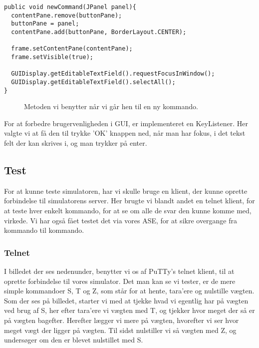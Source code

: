 \documentclass[a4paper]{article}
\begin{document}
\begin{lstlisting}
public void newCommand(JPanel panel){
  contentPane.remove(buttonPane);
  buttonPane = panel;
  contentPane.add(buttonPane, BorderLayout.CENTER);
  
  frame.setContentPane(contentPane);
  frame.setVisible(true);
  
  GUIDisplay.getEditableTextField().requestFocusInWindow();
  GUIDisplay.getEditableTextField().selectAll();
}
\end{lstlisting}
\begin{figure}[h!]
  \caption{Metoden vi benytter når vi går hen til en ny kommando.}
\end{figure}

For at forbedre brugervenligheden i GUI, er implementeret en KeyListener. Her valgte vi at få den til trykke 'OK' knappen ned, når man har fokus, i det tekst felt der kan skrives i, og man trykker på enter.




\subsection{Test} %

For at kunne teste simulatoren, har vi skulle bruge en klient, der kunne oprette forbindelse til simulatorens server. Her brugte vi blandt andet en telnet klient, for at teste hver enkelt kommando, for at se om alle de svar den kunne komme med, virkede. Vi har også fået testet det via vores ASE, for at sikre overgange fra kommando til kommando.

\subsubsection{Telnet} %

I billedet der ses nedenunder, benytter vi os af PuTTy’s telnet klient, til at oprette forbindelse til vores simulator. Det man kan se vi tester, er de mere simple kommandoer S, T og Z, som står for at hente, tara’ere og nulstille vægten. Som der ses på billedet, starter vi med at tjekke hvad vi egentlig har på vægten ved brug af S, her efter tara’ere vi vægten med T, og tjekker hvor meget der så er på vægten bagefter. Herefter lægger vi mere på vægten, hvorefter vi ser hvor meget vægt der ligger på vægten. Til sidst nulstiller vi så vægten med Z, og undersøger om den er blevet nulstillet med S.
\end{document}
